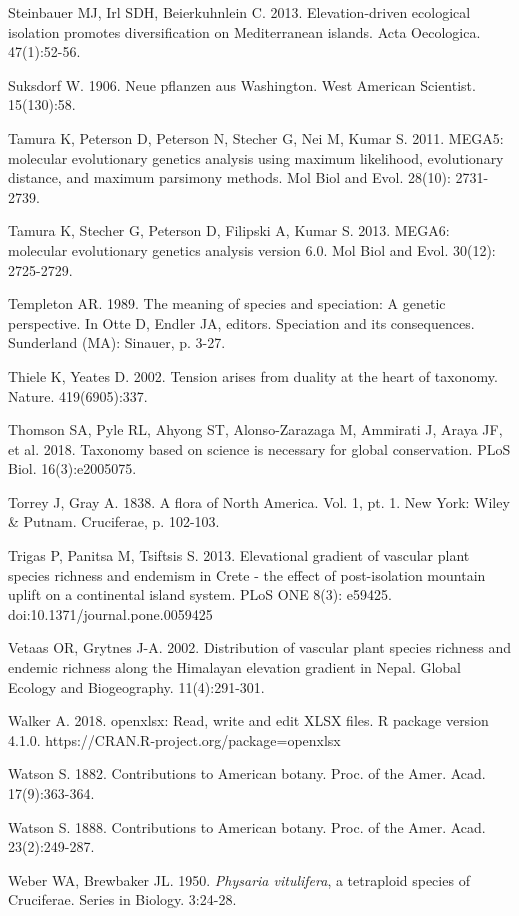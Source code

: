 Steinbauer MJ, Irl SDH, Beierkuhnlein C. 2013. Elevation-driven ecological isolation promotes diversification on Mediterranean islands. Acta Oecologica. 47(1):52-56.

Suksdorf W. 1906. Neue pflanzen aus Washington. West American Scientist. 15(130):58.

Tamura K, Peterson D, Peterson N, Stecher G, Nei M, Kumar S. 2011. MEGA5: molecular evolutionary genetics analysis using maximum likelihood, evolutionary distance, and maximum parsimony methods. Mol Biol and Evol. 28(10): 2731-2739.

Tamura K, Stecher G, Peterson D, Filipski A, Kumar S. 2013. MEGA6: molecular evolutionary genetics analysis version 6.0. Mol Biol and Evol. 30(12): 2725-2729.

Templeton AR. 1989. The meaning of species and speciation: A genetic perspective. In Otte D, Endler JA, editors. Speciation and its consequences. Sunderland (MA): Sinauer, p. 3-27.

Thiele K, Yeates D. 2002. Tension arises from duality at the heart of taxonomy. Nature. 419(6905):337.

Thomson SA, Pyle RL, Ahyong ST, Alonso-Zarazaga M, Ammirati J, Araya JF, et al. 2018. Taxonomy based on science is necessary for global conservation. PLoS Biol. 16(3):e2005075.

Torrey J, Gray A. 1838. A flora of North America. Vol. 1, pt. 1. New York: Wiley \& Putnam. Cruciferae, p. 102-103.

Trigas P, Panitsa M, Tsiftsis S. 2013. Elevational gradient of vascular plant species richness and endemism in Crete - the effect of post-isolation mountain uplift on a continental island system. PLoS ONE 8(3): e59425. doi:10.1371/journal.pone.0059425

Vetaas OR, Grytnes J-A. 2002. Distribution of vascular plant species richness and endemic richness along the Himalayan elevation gradient in Nepal. Global Ecology and Biogeography. 11(4):291-301.

Walker A. 2018. openxlsx: Read, write and edit XLSX files. R package version 4.1.0. https://CRAN.R-project.org/package=openxlsx
  
Watson S. 1882. Contributions to American botany. Proc. of the Amer. Acad. 17(9):363-364.

Watson S. 1888. Contributions to American botany. Proc. of the Amer. Acad. 23(2):249-287.

Weber WA, Brewbaker JL. 1950. \textit{Physaria vitulifera}, a tetraploid species of Cruciferae. Series in Biology. 3:24-28.

